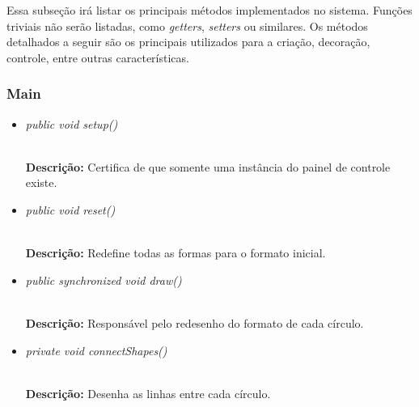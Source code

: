 \documentclass[12pt]{article}
\begin{document}
Essa subseção irá listar os principais métodos implementados no sistema. Funções triviais não serão listadas, como \textit{getters}, \textit{setters} ou similares. Os métodos detalhados a seguir são os principais utilizados para a criação, decoração, controle, entre outras características.

\subsubsection{Main}

\begin{itemize}
\item \begin{large}\textit{public void setup()}\end{large}\\	
\subitem \textbf{Descrição:} Certifica de que somente uma instância do painel de controle existe.
\end{itemize}

\vspace{0.2 true cm}

\begin{itemize}
\item \begin{large}\textit{public void reset()}\end{large}\\
\subitem \textbf{Descrição:} Redefine todas as formas para o formato inicial.
\end{itemize}

\vspace{0.2 true cm}

\begin{itemize}
\item \begin{large}\textit{public synchronized void draw()}\end{large}\\
\subitem \textbf{Descrição:} Responsável pelo redesenho do formato de cada círculo.
\end{itemize}

\vspace{0.2 true cm}

\begin{itemize}
\item \begin{large}\textit{private void connectShapes()}\end{large}\\
\subitem \textbf{Descrição:} Desenha as linhas entre cada círculo.
\end{itemize}
\end{document}
